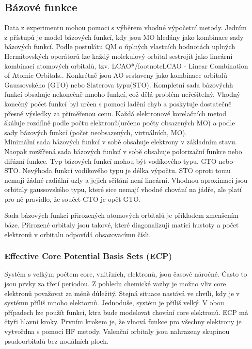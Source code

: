 \documentclass[
  digital, %
  table,   %
  lof,     %
  lot,     %
]{fithesis3}
\begin{document}
\subsection{Bázové funkce}
Data z experimentu mohou pomoci s výběrem vhodné výpočetní metody. Jedním z přístupů je model bázových funkcí, kdy jsou MO hledány jako kombinace sady bázových funkcí. Podle postulátu QM o úplných vlastních hodnotách uplných Hermitovských operátorů lze každý molekulový orbital sestrojit jako lineární kombinaci atomových orbitalů, tzv. LCAO*/footnote{LCAO - Linear Combination of Atomic Orbitals.}. Konkrétně jsou AO sestaveny jako kombinace orbitalů Gaussovského (GTO) nebo Slaterova typu(STO).
Kompletní sada bázovýchh funkcí obsahuje nekonečně mnoho funkcí, což dělá problém neřešitelný. Vhodný konečný počet funkcí byl určen s pomocí ladění chyb a poskytuje dostatečně přesné výsledky za příměřenou cenu. Každá elektronové korelačních metod škáluje rozdílně podle počtu elektronů(určeno počty obsazených MO) a podle sady bázových funkcí (počet neobsazených, virtuálních, MO).\\
Minimální sada bázových funkcí v sobě obsahuje elektrony v základním stavu. Naopak rozšířená sada bázových funkcí v sobě obsahuje polorizační funkce nebo difúzní funkce. Typ bázových funkcí mohou být vodíkového typu, GTO nebo STO. Nevýhoda funkcí vodíkového typu je délka výpočtu. STO oproti tomu nemají žádné radiální uzly a jejich sčítání není lineární. Vhodnou aproximací jsou orbitaly gaussovského typu, které sice nemají vhodné chování na jádře, ale platí pro ně pravidlo, že součet GTO je opět GTO.\cite{lowe2011quantum}

Sada bázových funkcí přirozených atomových orbitalů je příkladem zmenšením báze. Přirozené orbitaly jsou takové, které diagonalizují matici hustoty a počet elektronů v orbitalu odpovídá obsazovacímu čísli.

\subsubsection{Effective Core Potential Basis Sets (ECP)}
Systém s velkým počtem core, vnitřních, elektronů, jsou časové náročné. Často to jsou prvky za třetí periodou. Z pohledu chemické vazby je možno vliv core elektronů považovat za méně důležitý. Stejná situace nastává ve chvíli, kdy je v systému příliš mnoho elektornů. Jednoduše, systém je příliš velký. V obou případech lze použít funkci, ktra bude modelovat chování core elektronů. ECP má čtyři hlavní kroky. Prvním krokem je, že vlnová funkce pro všechny elektrony je vytvořdna s pomocí HF metody. Valenční orbitaly jsou nahrazeny skupinou psudoorbitalů bez nodálních ploch.
\end{document}
